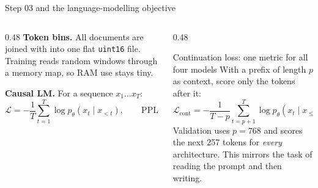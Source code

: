 \documentclass[aspectratio=169,11pt]{beamer}
\newcommand{\code}[1]{\texttt{\small #1}}
\begin{document}
\begin{frame}{Step 03 and the language-modelling objective}
  \begin{columns}[T]
    \begin{column}{0.48\textwidth}
      \small
      \textbf{Token bins.} All documents are joined with \code{<|endoftext|>} into one flat \code{uint16} file.
      Training reads random windows through a memory map, so RAM use stays tiny.
      \vspace{2mm}

      \textbf{Causal LM.} For a sequence $x_1\ldots x_T$:
      \[
        \mathcal{L}=-\frac{1}{T}\sum_{t=1}^{T}\log p_\theta(x_t\mid x_{<t}),
        \qquad \text{PPL}=e^{\mathcal{L}}
      \]
    \end{column}
    \begin{column}{0.48\textwidth}
      \begin{block}{Continuation loss: one metric for all four models}
        \small
        With a prefix of length $p$ as context, score only the tokens after it:
        \[
          \mathcal{L}_{\text{cont}}=-\frac{1}{T-p}\sum_{t=p+1}^{T}\log p_\theta(x_t\mid x_{\le p},\,x_{p+1..t-1})
        \]
        Validation uses $p=768$ and scores the next 257 tokens for \emph{every} architecture.
        This mirrors the task of reading the prompt and then writing.
      \end{block}
    \end{column}
  \end{columns}
\end{frame}
\end{document}
